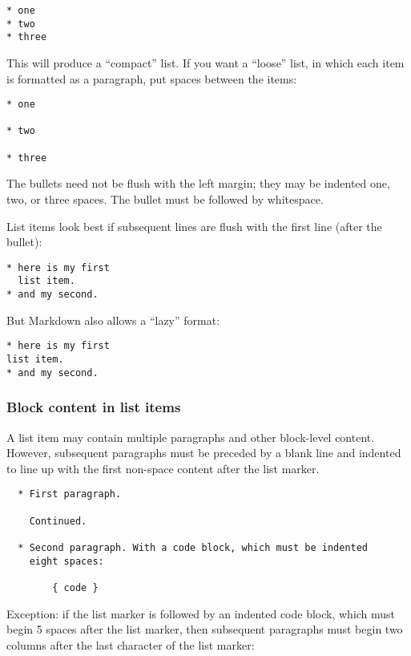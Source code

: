 \documentclass[]{article}
\begin{document}
\begin{verbatim}
* one
* two
* three
\end{verbatim}

This will produce a ``compact'' list. If you want a ``loose'' list, in
which each item is formatted as a paragraph, put spaces between the
items:

\begin{verbatim}
* one

* two

* three
\end{verbatim}

The bullets need not be flush with the left margin; they may be indented
one, two, or three spaces. The bullet must be followed by whitespace.

List items look best if subsequent lines are flush with the first line
(after the bullet):

\begin{verbatim}
* here is my first
  list item.
* and my second.
\end{verbatim}

But Markdown also allows a ``lazy'' format:

\begin{verbatim}
* here is my first
list item.
* and my second.
\end{verbatim}

\hypertarget{block-content-in-list-items}{%
\subsubsection{Block content in list
items}\label{block-content-in-list-items}}

A list item may contain multiple paragraphs and other block-level
content. However, subsequent paragraphs must be preceded by a blank line
and indented to line up with the first non-space content after the list
marker.

\begin{verbatim}
  * First paragraph.

    Continued.

  * Second paragraph. With a code block, which must be indented
    eight spaces:

        { code }
\end{verbatim}

Exception: if the list marker is followed by an indented code block,
which must begin 5 spaces after the list marker, then subsequent
paragraphs must begin two columns after the last character of the list
marker:
\end{document}
